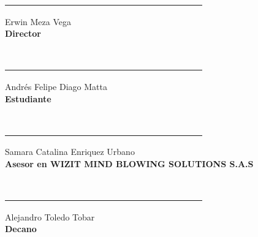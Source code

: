 \newpage

\begin{flushleft}
    \underline{\ \ \ \ \ \ \ \ \ \ \ \ \ \ \ \ \ \ \ \ \ \ \ \ \ \ \ \ \ \ \ \ \ \ \ \ \ \ \ \ \ \ \ \ \ \ }
\end{flushleft} 
Erwin Meza Vega \\ 
\textbf{Director \\ \\ } 


\begin{flushleft}
    \underline{\ \ \ \ \ \ \ \ \ \ \ \ \ \ \ \ \ \ \ \ \ \ \ \ \ \ \ \ \ \ \ \ \ \ \ \ \ \ \ \ \ \ \ \ \ \ }
\end{flushleft} 
Andrés Felipe Diago Matta \\ 
\textbf{Estudiante \\ \\} 


\begin{flushleft}
    \underline{\ \ \ \ \ \ \ \ \ \ \ \ \ \ \ \ \ \ \ \ \ \ \ \ \ \ \ \ \ \ \ \ \ \ \ \ \ \ \ \ \ \ \ \ \ \ }
\end{flushleft} 
Samara Catalina Enriquez Urbano \\ 
\textbf{Asesor en WIZIT MIND BLOWING SOLUTIONS S.A.S \\ \\} 


\begin{flushleft}
    \underline{\ \ \ \ \ \ \ \ \ \ \ \ \ \ \ \ \ \ \ \ \ \ \ \ \ \ \ \ \ \ \ \ \ \ \ \ \ \ \ \ \ \ \ \ \ \ }
\end{flushleft} 
Alejandro Toledo Tobar \\ 
\textbf{Decano \\ \\} 



